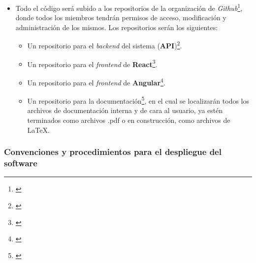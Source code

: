 \documentclass[11pt, a4paper, titlepage]{article}
\begin{document}
\begin{itemize}
    \item Todo el código será subido a los repositorios de la organización de \textit{Github}\footnote{\href{https://github.com/UNIZAR-30226-2022-01}{}}, donde todos los miembros tendrán permisos de acceso, modificación y administración de los mismos. Los repositorios serán los siguientes:
    \begin{itemize}
        \item Un repositorio para el \textit{backend} del sistema (\textbf{API})\footnote{\href{https://github.com/UNIZAR-30226-2022-01/proyecto_software_backend}{}}.
        
        \item Un repositorio para el \textit{frontend} de \textbf{React}\footnote{\href{https://github.com/UNIZAR-30226-2022-01/proyecto_software_frontend_react}{}}.
        
        \item Un repositorio para el \textit{frontend} de \textbf{Angular}\footnote{\href{https://github.com/UNIZAR-30226-2022-01/proyecto_software_frontend_angular}{}}.
        
        \item Un repositorio para la documentación\footnote{\href{https://github.com/UNIZAR-30226-2022-01/proyecto_software_documentacion}{\color{blue}{Repositorio de documentación}}}, en el cual se localizarán todos los archivos de documentación interna y de cara al usuario, ya estén terminados como archivos .pdf o en construcción, como archivos de \LaTeX.
    \end{itemize}
    
    
    
    
\end{itemize}

\subsubsection{Convenciones y procedimientos para el despliegue del software}
\end{document}
